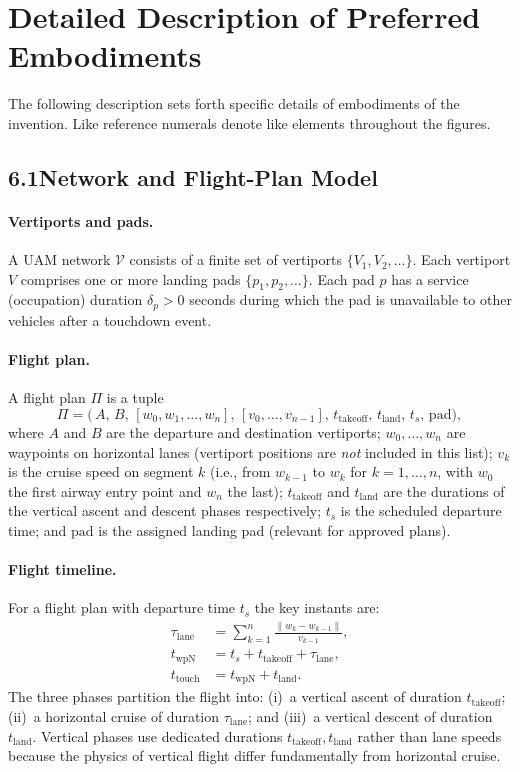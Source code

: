 \documentclass[12pt,a4paper]{article}
\newcommand{\twpN}{t_{\mathrm{wpN}}}
\newcommand{\ttouch}{t_{\mathrm{touch}}}
\newcommand{\tto}{t_{\mathrm{takeoff}}}
\newcommand{\tland}{t_{\mathrm{land}}}
\newcommand{\lane}{\tau_{\mathrm{lane}}}
\begin{document}
\section{Detailed Description of Preferred Embodiments}

The following description sets forth specific details of embodiments of the
invention.  Like reference numerals denote like elements throughout the figures.

\subsection*{6.1\quad Network and Flight-Plan Model}

\paragraph{Vertiports and pads.}
A UAM network $\mathcal{V}$ consists of a finite set of vertiports
$\{V_1, V_2, \ldots\}$.  Each vertiport $V$ comprises one or more landing
pads $\{p_1, p_2, \ldots\}$.  Each pad $p$ has a service (occupation) duration
$\delta_p > 0$ seconds during which the pad is unavailable to other vehicles
after a touchdown event.

\paragraph{Flight plan.}
A flight plan $\Pi$ is a tuple
\[
  \Pi = \bigl(\,A,\, B,\, [w_0, w_1, \ldots, w_n],\, [v_0, \ldots, v_{n-1}],\,
             \tto,\, \tland,\, t_s,\, \text{pad}\bigr),
\]
where $A$ and $B$ are the departure and destination vertiports; $w_0, \ldots,
w_n$ are waypoints on horizontal lanes (vertiport positions are \emph{not}
included in this list); $v_k$ is the cruise speed on segment $k$ (i.e., from
$w_{k-1}$ to $w_k$ for $k=1,\ldots,n$, with $w_0$ the first airway entry
point and $w_n$ the last); $\tto$ and $\tland$ are the durations of the
vertical ascent and descent phases respectively; $t_s$ is the scheduled
departure time; and $\mathrm{pad}$ is the assigned landing pad (relevant for
approved plans).

\paragraph{Flight timeline.}
For a flight plan with departure time $t_s$ the key instants are:
\begin{align}
  \lane &= \sum_{k=1}^{n} \frac{\|w_k - w_{k-1}\|}{v_{k-1}},
  \label{eq:lane_time}\\
  \twpN &= t_s + \tto + \lane,
  \label{eq:twpn}\\
  \ttouch &= \twpN + \tland.
  \label{eq:ttouch}
\end{align}
The three phases partition the flight into: (i)~a vertical ascent of duration
$\tto$; (ii)~a horizontal cruise of duration $\lane$; and (iii)~a vertical
descent of duration $\tland$.  Vertical phases use dedicated durations
$\tto, \tland$ rather than lane speeds because the physics of vertical flight
differ fundamentally from horizontal cruise.
\end{document}

